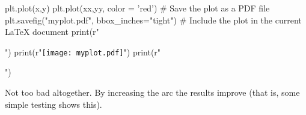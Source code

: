 \documentclass[a4paper,11pt]{article}
\begin{document}
\begin{pycode}
plt.plot(x,y)
plt.plot(xx,yy, color = 'red')
# Save the plot as a PDF file
plt.savefig("myplot.pdf", bbox_inches="tight")
# Include the plot in the current LaTeX document
print(r"\begin{center}")
print(r"\texttt{[image: myplot.pdf]}")
print(r"\end{center}")
\end{pycode}


Not too bad altogether.
By increasing the arc the results improve (that is, some simple testing shows this).
\end{document}
